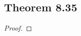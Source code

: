 \documentclass[../../main.tex]{subfiles}
\begin{document}
\subsection{Theorem 8.35}
\begin{wts}

\end{wts}
\begin{proof}

\end{proof}
\end{document}
